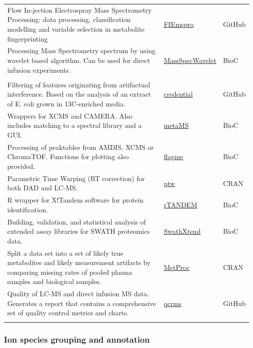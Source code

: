 \documentclass[]{article}
\begin{document}
\begin{longtable}[t]{>{\raggedright\arraybackslash}p{30em}>{\raggedright\arraybackslash}p{10em}>{\raggedright\arraybackslash}p{3em}}
Flow In-jection Electrospray Mass Spectrometry Processing: data processing, classification modelling and variable selection in metabolite fingerprinting & \href{https://github.com/aberHRML/FIEmspro}{FIEmspro} & GitHub\\
\rowcolor{gray!6}  Processing Mass Spectrometry spectrum by using wavelet based algorithm. Can be used for direct infusion experiments. & \href{http://bioconductor.org/packages/release/bioc/html/MassSpecWavelet.html}{MassSpecWavelet} & BioC\\
\addlinespace[0.3em]
\multicolumn{3}{l}{\textbf{Other}}\\
Filtering of features originating from artifactual interference. Based on the analysis of an extract of E. coli grown in 13C-enriched media. & \href{https://github.com/pattilab/credential}{credential} & GitHub\\
\rowcolor{gray!6}  Wrappers for XCMS and CAMERA. Also includes matching to a spectral library and a GUI. & \href{https://doi.org/doi:10.18129/B9.bioc.metaMS}{metaMS} & BioC\\
Processing of peaktables from AMDIS, XCMS or ChromaTOF. Functions for plotting also provided. & \href{https://doi.org/doi:10.18129/B9.bioc.flagme}{flagme} & BioC\\
\rowcolor{gray!6}  Parametric Time Warping (RT correction) for both DAD and LC-MS. & \href{https://cran.r-project.org/package=ptw}{ptw} & CRAN\\
R wrapper for X!Tandem software for protein identification. & \href{http://bioconductor.org/packages/release/bioc/html/rTANDEM.html}{rTANDEM} & BioC\\
\rowcolor{gray!6}  Building, validation, and statistical analysis of extended assay libraries for SWATH proteomics data. & \href{https://bioconductor.org/packages/release/bioc/html/SwathXtend.html}{SwathXtend} & BioC\\
Split a data set into a set of likely true metabolites and likely measurement artifacts by comparing missing rates of pooled plasma samples and biological samples. & \href{https://cran.r-project.org/package=MetProc}{MetProc} & CRAN\\
\rowcolor{gray!6}  Quality of LC-MS and direct infusion MS data. Generates a report that contains a comprehensive set of quality control metrics and charts. & \href{https://github.com/computational-metabolomics/qcrms}{qcrms} & GitHub\\*
\end{longtable}

\hypertarget{ion-species-grouping-and-annotation}{%
\subsubsection{Ion species grouping and annotation}\label{ion-species-grouping-and-annotation}}
\end{document}
